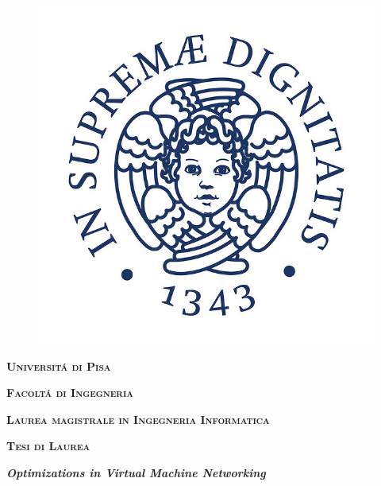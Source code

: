 \begin{titlepage}
\pagestyle{empty}
\begingroup
\vspace*{-8.5\topskip}

\begin{figure}[!h]
\begin{center}
\includegraphics[scale=0.3]{logo_unipi}
\end{center}
\end{figure}

\vspace*{-0.5cm}

\begin{center}
        \large{\bf\expandafter\textsc {Universit\'a di Pisa}}\par 
		  \large{\bf\expandafter\textsc {Facolt\'a di Ingegneria}}\par
		  \large{\bf\expandafter\textsc {Laurea magistrale in Ingegneria Informatica}}\par
        \vspace{0.5cm}
        \large{\bf\expandafter\textsc {Tesi di Laurea}}
\end{center}



\vspace{1.5cm}
\begin{center}
        {\LARGE\bf\textit{Optimizations in Virtual Machine Networking}}
\end{center}


\end{titlepage}
